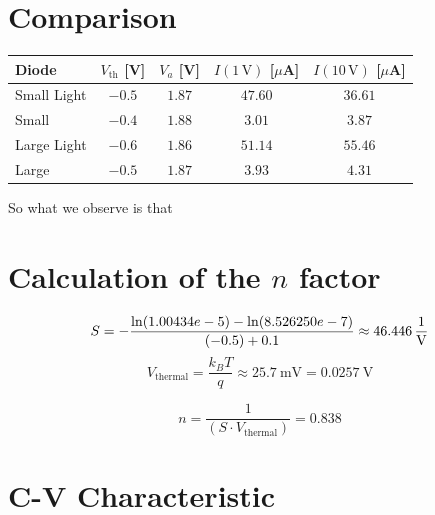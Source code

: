 \documentclass[10pt,a4paper]{report}
\begin{document}
\section{Comparison}
\begin{table}[h!]
        \centering
        \begin{tabular}{lcccc}
                \toprule
                Diode & $V_\mathrm{th}$ [V] & $V_a$ [V] & $I(1\,\mathrm{V})$ [$\mu$A] & $I(10\,\mathrm{V})$ [$\mu$A] \\
                \midrule
                Small Light & $-0.5$ & $1.87$ & $47.60$ & $36.61$ \\
                Small       & $-0.4$ & $1.88$ & $3.01$  & $3.87$  \\
                Large Light & $-0.6$ & $1.86$ & $51.14$ & $55.46$ \\
                Large       & $-0.5$ & $1.87$ & $3.93$  & $4.31$  \\
                \bottomrule
        \end{tabular}
\end{table}


So what we observe is that 

\section{Calculation of the $n$ factor}
\[
  S =  - \frac{\ln(1.00434e-5) - \ln(8.526250e-7)}{(-0.5) +0.1} \approx \SI {46,446}{ \frac{1}{\V}}
\]
\[
  V_{\text{thermal}} = \frac{k_B T }{q} \approx \SI{25,7}{ \milli \V} = \SI {0,0257} {\V}
\]

\[
  n = \frac {1} {(S \cdot V_\text{thermal})} = 0.838
\]
\section{C-V Characteristic}
\end{document}
